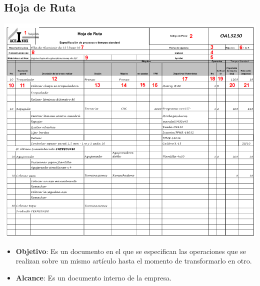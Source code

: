 \pagebreak
\subsection{Hoja de Ruta}
\begin{center}
 \includegraphics[angle=90,scale=0.95,keepaspectratio=true]{./Circuitos-Teoricos/Produccion/Images/hoja-de-ruta.png}
\end{center}

\pagebreak
\begin{itemize}
 \item \textbf{Objetivo}: Es un documento en el que se especifican las operaciones que se realizan sobre un mismo artículo hasta el momento de transformarlo en otro.
 \item \textbf{Alcance}: Es un documento interno de la empresa.
\end{itemize}

